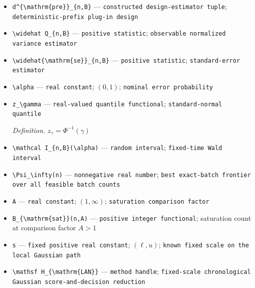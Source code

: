 \documentclass{article}
\begin{document}
\begin{itemize}
  \item \texttt{d\textasciicircum{}\{\textbackslash{}\allowbreak{}mathrm\{pre\}\allowbreak{}\}\allowbreak{}\_\allowbreak{}\{n,\allowbreak{}B\}\allowbreak{}} --- \texttt{constructed design-\allowbreak{}estimator tuple}; \texttt{deterministic-\allowbreak{}prefix plug-\allowbreak{}in design}
  \item \texttt{\textbackslash{}\allowbreak{}widehat Q\_\allowbreak{}\{n,\allowbreak{}B\}\allowbreak{}} --- \texttt{positive statistic}; \texttt{observable normalized variance estimator}
  \item \texttt{\textbackslash{}\allowbreak{}widehat\{\textbackslash{}\allowbreak{}mathrm\{se\}\allowbreak{}\}\allowbreak{}\_\allowbreak{}\{n,\allowbreak{}B\}\allowbreak{}} --- \texttt{positive statistic}; \texttt{standard-\allowbreak{}error estimator}
  \item \texttt{\textbackslash{}\allowbreak{}alpha} --- \texttt{real constant}; \((0,1)\); \texttt{nominal error probability}
  \item \texttt{z\_\allowbreak{}\textbackslash{}\allowbreak{}gamma} --- \texttt{real-\allowbreak{}valued quantile functional}; \texttt{standard-\allowbreak{}normal quantile}
  \par\smallskip\noindent\emph{Definition.} \(z_\gamma=\Phi^{-1}(\gamma)\)
  \item \texttt{\textbackslash{}\allowbreak{}mathcal I\_\allowbreak{}\{n,\allowbreak{}B\}\allowbreak{}(\textbackslash{}\allowbreak{}alpha)} --- \texttt{random interval}; \texttt{fixed-\allowbreak{}time Wald interval}
  \item \texttt{\textbackslash{}\allowbreak{}Psi\_\allowbreak{}\textbackslash{}\allowbreak{}infty(n)} --- \texttt{nonnegative real number}; \texttt{best exact-\allowbreak{}batch frontier over all feasible batch counts}
  \item \texttt{A} --- \texttt{real constant}; \((1,\infty)\); \texttt{saturation comparison factor}
  \item \texttt{B\_\allowbreak{}\{\textbackslash{}\allowbreak{}mathrm\{sat\}\allowbreak{}\}\allowbreak{}(n,\allowbreak{}A)} --- \texttt{positive integer functional}; saturation count at comparison factor \(A>1\)
  \item \texttt{s} --- \texttt{fixed positive real constant}; \((\ell,u)\); \texttt{known fixed scale on the local Gaussian path}
  \item \texttt{\textbackslash{}\allowbreak{}mathsf H\_\allowbreak{}\{\textbackslash{}\allowbreak{}mathrm\{LAN\}\allowbreak{}\}\allowbreak{}} --- \texttt{method handle}; \texttt{fixed-\allowbreak{}scale chronological Gaussian score-\allowbreak{}and-\allowbreak{}decision reduction}
\end{itemize}
\end{document}
